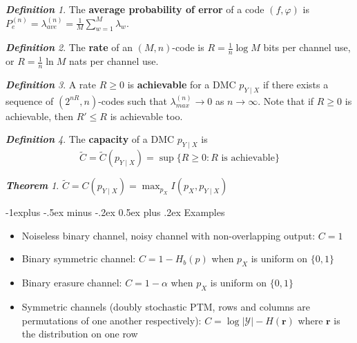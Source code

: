\documentclass[frenchspacing,9pt,landscape,a4paper]{article}
\makeatletter
\renewcommand{\subsection}{\@startsection{subsection}{2}{0mm}%
                                {-1explus -.5ex minus -.2ex}%
                                {0.5ex plus .2ex}%
                                {\normalfont\normalsize\bfseries}}
\newcommand{\mb}[1]{\mathbf {#1}}
\newcommand{\abs}[1]{\left\lvert #1 \right\rvert}
\theoremstyle{remark}
\newtheorem*{thm}{\textbf{Theorem}}
\newtheorem*{defn}{\textbf{Definition}}
\makeatother
\begin{document}
\begin{multicols}{4}
\begin{defn}
    The \textbf{average probability of error} of a code $(f,\varphi)$ is
    $P_e^{(n)}=\lambda_{ave}^{(n)}=\frac{1}{M}\sum_{w=1}^M\lambda_w$.
\end{defn}
\begin{defn}
    The \textbf{rate} of an $(M,n)$-code is  $R=\frac{1}{n}\log M$ bits per channel use, or
    $R=\frac{1}{n}\ln M$ nats per channel use.
\end{defn}
\begin{defn}
    A rate $R\geq 0$ is \textbf{achievable} for a DMC  $p_{Y\mid X}$ if there exists a sequence of
    $(2^{nR},n)$-codes such that  $\lambda_{max}^{(n)}\to 0$ as  $n\to\infty$. Note that if $R\geq 0$ is
    achievable, then  $R'\leq R$ is achievable too.
\end{defn}
\begin{defn}
    The \textbf{capacity} of a DMC $p_{Y\mid X}$ is
    \[\tilde{C}=\tilde{C}(p_{Y\mid X})=\sup\{R\geq 0: R\text{ is achievable}\}\]
\end{defn}
\begin{thm}
    $\tilde{C}=C(p_{Y\mid X})=\max_{p_X} I(p_X,p_{Y\mid X})$
\end{thm}
\subsection{Examples}
\begin{itemize}
    \item Noiseless binary channel, noisy channel with non-overlapping output: $C=1$
    \item Binary symmetric channel:  $C=1-H_b(p)$ when  $p_X$ is uniform on  $\{0,1\}$
    \item Binary erasure channel:  $C=1-\alpha$ when  $p_X$ is uniform on  $\{0,1\}$
    \item Symmetric channels (doubly stochastic PTM, rows and columns are permutations of one another respectively):
        $C=\log\abs{\mathcal{Y}}-H(\mb{r})$ where  $\mb{r}$ is the distribution on one row
\end{itemize}

\end{multicols}
\end{document}
